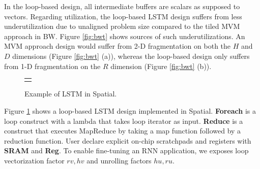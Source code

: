 In the loop-based design, all intermediate buffers are scalars as supposed to vectors. 
Regarding utilization, the loop-based LSTM design suffers from less underutilization due to unaligned problem size 
compared to the tiled MVM approach in BW. Figure \ref{fig:bwt} shows sources of such underutilizations.
An MVM approach design would suffer from 2-D fragmentation on both the $H$ and $D$ dimensions (Figure \ref{fig:bwt} (a)), whereas
the loop-based design only suffers from 1-D fragmentation on the $R$ dimension (Figure \ref{fig:bwt} (b)).

\begin{figure}
  \centering
  \newsavebox{\lstm}
  \begin{lrbox}{\lstm}
    
  \end{lrbox}
  \begin{tabular} {c}
    \usebox{\lstm} \\
  \end{tabular}
  \caption{Example of LSTM in Spatial.}
\label{fig:spatial_app}
\end{figure}

Figure \ref{fig:spatial_app} shows a loop-based LSTM design implemented in Spatial.
\textbf{Foreach} is a loop construct with a lambda that takes loop iterator as input.
\textbf{Reduce} is a construct that executes MapReduce by taking a map function followed
by a reduction function. User declare explicit on-chip scratchpads and registers with
\textbf{SRAM} and \textbf{Reg}.
To enable fine-tuning an RNN application, we exposes loop vectorization factor $rv, hv$ and
unrolling factors $hu, ru$.
